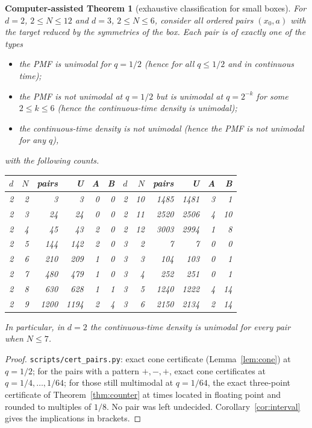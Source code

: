 \documentclass[11pt,a4paper]{article}
\newtheorem{catheorem}[theorem]{Computer-assisted Theorem}
\theoremstyle{definition}
\begin{document}
\begin{catheorem}[exhaustive classification for small boxes]\label{thm:pairs}
For $d=2$, $2\le N\le12$ and $d=3$, $2\le N\le6$, consider all ordered pairs $(x_0,a)$ with the target reduced by the symmetries of the box. Each pair is of exactly one of the types
\begin{itemize}
\item[\textbf{U}] the PMF is unimodal for $q=1/2$ (hence for all $q\le1/2$ and in continuous time);
\item[\textbf{A}] the PMF is not unimodal at $q=1/2$ but is unimodal at $q=2^{-k}$ for some $2\le k\le6$ (hence the continuous-time density is unimodal);
\item[\textbf{B}] the continuous-time density is not unimodal (hence the PMF is not unimodal for any $q$),
\end{itemize}
with the following counts.
\begin{center}
\begin{tabular}{rrrrrr@{\qquad}rrrrrr}
\toprule
$d$&$N$&pairs&U&A&B&$d$&$N$&pairs&U&A&B\\\midrule
2&2&3&3&0&0&2&10&1485&1481&3&1\\
2&3&24&24&0&0&2&11&2520&2506&4&10\\
2&4&45&43&2&0&2&12&3003&2994&1&8\\
2&5&144&142&2&0&3&2&7&7&0&0\\
2&6&210&209&1&0&3&3&104&103&0&1\\
2&7&480&479&1&0&3&4&252&251&0&1\\
2&8&630&628&1&1&3&5&1240&1222&4&14\\
2&9&1200&1194&2&4&3&6&2150&2134&2&14\\\bottomrule
\end{tabular}
\end{center}
In particular, in $d=2$ the continuous-time density is unimodal for every pair when $N\le7$.
\end{catheorem}
\begin{proof}
\texttt{scripts/cert\_pairs.py}: exact cone certificate (Lemma~\ref{lem:cone}) at $q=1/2$; for the pairs with a pattern $+,-,+$, exact cone certificates at $q=1/4,\dots,1/64$; for those still multimodal at $q=1/64$, the exact three-point certificate of Theorem~\ref{thm:counter} at times located in floating point and rounded to multiples of $1/8$. No pair was left undecided. Corollary~\ref{cor:interval} gives the implications in brackets.
\end{proof}
\end{document}
